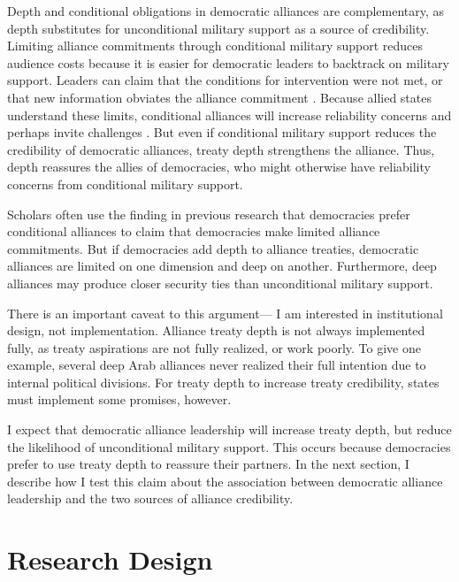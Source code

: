 \documentclass[12pt]{article}
\begin{document}
Depth and conditional obligations in democratic alliances are complementary, as depth substitutes for unconditional military support as a source of credibility. 
Limiting alliance commitments through conditional military support reduces audience costs because it is easier for democratic leaders to backtrack on military support. 
Leaders can claim that the conditions for intervention were not met, or that new information obviates the alliance commitment \citep{LevenduskyHorowitz2012}. 
Because allied states understand these limits, conditional alliances will increase reliability concerns and perhaps invite challenges \citep{Smith1995}. 
But even if conditional military support reduces the credibility of democratic alliances, treaty depth strengthens the alliance. 
Thus, depth reassures the allies of democracies, who might otherwise have reliability concerns from conditional military support. 


Scholars often use the finding in previous research that democracies prefer conditional alliances to claim that democracies make limited alliance commitments. 
But if democracies add depth to alliance treaties, democratic alliances are limited on one dimension and deep on another. 
Furthermore, deep alliances may produce closer security ties than unconditional military support.  


There is an important caveat to this argument--- I am interested in institutional design, not implementation.
Alliance treaty depth is not always implemented fully, as treaty aspirations are not fully realized, or work poorly. 
To give one example, several deep Arab alliances never realized their full intention due to internal political divisions.  
For treaty depth to increase treaty credibility, states must implement some promises, however. 


I expect that democratic alliance leadership will increase treaty depth, but reduce the likelihood of unconditional military support.  
This occurs because democracies prefer to use treaty depth to reassure their partners. 
In the next section, I describe how I test this claim about the association between democratic alliance leadership and the two sources of alliance credibility. 



\section{Research Design}
\end{document}
